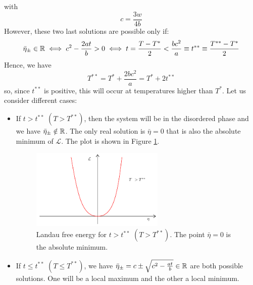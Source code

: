 \documentclass[../../Main/Main.tex]{subfiles}
\begin{document}
with
\begin{equation*}
  c = \frac{3w}{4b}
\end{equation*}
However, these two last solutions are possible only if:
\begin{equation*}
  \bar{\eta }_{\pm} \in \mathbb{R} \iff c^2 - \frac{2at}{b}>0  \iff t = \frac{T-T^*}{2} < \frac{bc^2}{a} \equiv t^{**} \equiv  \frac{T^{**}-T^*}{2}
\end{equation*}
Hence, we have
\begin{equation*}
  T^{**} = T^* + \frac{2bc^2}{a} = T^* + 2t^{**}
\end{equation*}
so, since \( t^{**} \) is positive, this will occur at temperatures higher than \( T^* \).
Let us consider different cases:
\begin{itemize}
\item If \( t> t^{**} \) \( ( T > T^ {**}) \), then the system will be in the disordered phase and we have  \( \bar{\eta }_\pm \notin \mathbb{R}  \). The only real solution is \( \bar{\eta }=0  \) that is also the absolute minimum of \( \mathcal{L} \). The plot is shown in Figure \ref{fig:16_1}.
\begin{figure}[H]
\centering
\includegraphics[width=0.6\textwidth]{./img/1.pdf}
\caption{\label{fig:16_1} Landau free energy for \( t> t^{**} \) \( ( T > T^ {**}) \). The point \( \bar{\eta }=0  \) is the absolute minimum.}
\end{figure}


\item If \( t \le t^{**} \) \( ( T \le T^ {**}) \), we have \( \bar{\eta }_\pm = c \pm \sqrt{c^2 - \frac{at}{b}} \in \mathbb{R}  \) are both possible solutions. One will be a local maximum and the other a local minimum.


\end{itemize}
\end{document}
